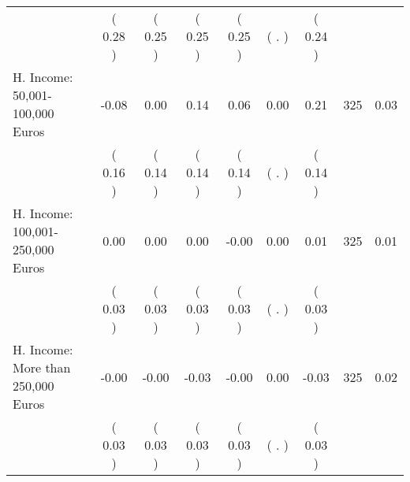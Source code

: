 \begin{tabular}{lcccccccc}
 & (     0.28 ) & (     0.25 ) & (     0.25 ) & (     0.25 ) & (        . ) & (     0.24 ) & \\
H. Income: 50,001-100,000 Euros &     -0.08 &      0.00 &      0.14 &      0.06 &      0.00 &      0.21 & 325 &       0.03 \\ 
 & (     0.16 ) & (     0.14 ) & (     0.14 ) & (     0.14 ) & (        . ) & (     0.14 ) & \\
H. Income: 100,001-250,000 Euros &      0.00 &      0.00 &      0.00 &     -0.00 &      0.00 &      0.01 & 325 &       0.01 \\ 
 & (     0.03 ) & (     0.03 ) & (     0.03 ) & (     0.03 ) & (        . ) & (     0.03 ) & \\
H. Income: More than 250,000 Euros &     -0.00 &     -0.00 &     -0.03 &     -0.00 &      0.00 &     -0.03 & 325 &       0.02 \\ 
 & (     0.03 ) & (     0.03 ) & (     0.03 ) & (     0.03 ) & (        . ) & (     0.03 ) & \\
\bottomrule
\end{tabular}
